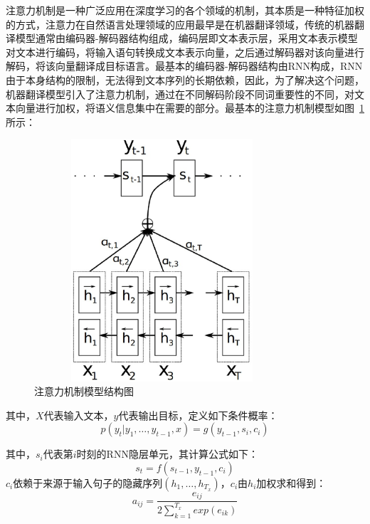 注意力机制是一种广泛应用在深度学习的各个领域的机制，其本质是一种特征加权的方式，注意力在自然语言处理领域的应用最早是在机器翻译领域\cite{bahdanau2014neural}，传统的机器翻译模型通常由编码器-解码器结构组成，编码层即文本表示层，采用文本表示模型对文本进行编码，将输入语句转换成文本表示向量，之后通过解码器对该向量进行解码，将该向量翻译成目标语言。最基本的编码器-解码器结构由RNN构成，RNN由于本身结构的限制，无法得到文本序列的长期依赖，因此，为了解决这个问题，机器翻译模型引入了注意力机制，通过在不同解码阶段不同词重要性的不同，对文本向量进行加权，将语义信息集中在需要的部分。最基本的注意力机制模型如图~\ref{fig:attention}所示：
\begin{figure}[htb]
    \centering
    \includegraphics[width=9.5cm,height=9cm, clip=true]{./sources/attention.eps}
    \vspace{-10pt}
    \caption{\label{fig:attention} 注意力机制模型结构图}
    \vspace{-5pt}
\end{figure}

其中，$X$代表输入文本，$y$代表输出目标，定义如下条件概率：
\begin{equation}
    p(y_t|y_1, \dots, y_{t-1},x) = g(y_{t-1},s_i,c_i)
\end{equation}

其中，$s_i$代表第$i$时刻的RNN隐层单元，其计算公式如下：
\begin{equation}
    s_t= f(s_{t-1},y_{t-1},c_i)
\end{equation}
$c_i$依赖于来源于输入句子的隐藏序列$(h_1,\dots,h_{T_x})$，$c_i$由$h_i$加权求和得到：
\begin{equation}
a_{ij} = \frac{e_{ij}}{2\sum_{k=1}^{T_x}exp(e_{ik})}
\end{equation}

